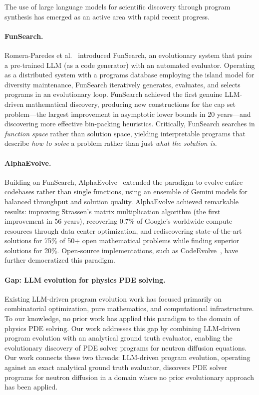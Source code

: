 The use of large language models for scientific discovery through program synthesis has emerged as an active area with rapid recent progress.

\paragraph{FunSearch.}
Romera-Paredes et al.~\cite{funsearch2024} introduced FunSearch, an evolutionary system that pairs a pre-trained LLM (as a code generator) with an automated evaluator.
Operating as a distributed system with a programs database employing the island model for diversity maintenance, FunSearch iteratively generates, evaluates, and selects programs in an evolutionary loop.
FunSearch achieved the first genuine LLM-driven mathematical discovery, producing new constructions for the cap set problem---the largest improvement in asymptotic lower bounds in 20 years---and discovering more effective bin-packing heuristics.
Critically, FunSearch searches in \emph{function space} rather than solution space, yielding interpretable programs that describe \emph{how to solve} a problem rather than just \emph{what the solution is}.

\paragraph{AlphaEvolve.}
Building on FunSearch, AlphaEvolve~\cite{alphaevolve2025} extended the paradigm to evolve entire codebases rather than single functions, using an ensemble of Gemini models for balanced throughput and solution quality.
AlphaEvolve achieved remarkable results: improving Strassen's matrix multiplication algorithm (the first improvement in 56 years), recovering 0.7\% of Google's worldwide compute resources through data center optimization, and rediscovering state-of-the-art solutions for 75\% of 50+ open mathematical problems while finding superior solutions for 20\%.
Open-source implementations, such as CodeEvolve~\cite{codeevolve2025}, have further democratized this paradigm.

\paragraph{Gap: LLM evolution for physics PDE solving.}
Existing LLM-driven program evolution work has focused primarily on combinatorial optimization, pure mathematics, and computational infrastructure.
To our knowledge, no prior work has applied this paradigm to the domain of physics PDE solving.
Our work addresses this gap by combining LLM-driven program evolution with an analytical ground truth evaluator, enabling the evolutionary discovery of PDE solver programs for neutron diffusion equations.
Our work connects these two threads: LLM-driven program evolution, operating against an exact analytical ground truth evaluator, discovers PDE solver programs for neutron diffusion in a domain where no prior evolutionary approach has been applied.
